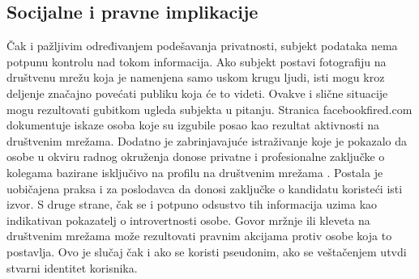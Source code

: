 \documentclass[a4paper]{article}
\begin{document}
\subsection{Socijalne i pravne implikacije}
Čak i pažljivim određivanjem podešavanja privatnosti, subjekt podataka nema potpunu kontrolu nad tokom informacija. Ako subjekt postavi fotografiju na društvenu mrežu koja je namenjena samo uskom krugu ljudi, isti mogu kroz deljenje
značajno povećati publiku koja će to videti. Ovakve i slične situacije mogu rezultovati gubitkom ugleda subjekta u pitanju. Stranica facebookfired.com dokumentuje iskaze osoba koje su izgubile posao kao rezultat aktivnosti na društvenim mrežama. Dodatno je zabrinjavajuće istraživanje koje je pokazalo da
osobe u okviru radnog okruženja donose privatne i profesionalne zaključke o kolegama bazirane isključivo na profilu na društvenim mrežama \cite{Jennifer}. Postala je uobičajena praksa i za poslodavca da donosi zaključke o kandidatu koristeći isti izvor. S druge strane, čak se i potpuno odsustvo tih
informacija uzima kao indikativan pokazatelj o introvertnosti osobe. Govor mržnje ili kleveta na društvenim mrežama može rezultovati pravnim akcijama protiv osobe koja to postavlja.
Ovo je slučaj čak i ako se koristi pseudonim, ako se veštačenjem utvdi stvarni identitet korisnika.
\newline
\end{document}
